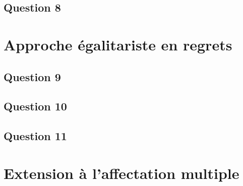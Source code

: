 \documentclass[a4paper, titlepage, oneside, 12pt]{article}%
\begin{document}
\subsection{Question 8}
\section{Approche égalitariste en regrets}

\subsection{Question 9}
\subsection{Question 10}
\subsection{Question 11}
\section{Extension à l'affectation multiple}
\end{document}
